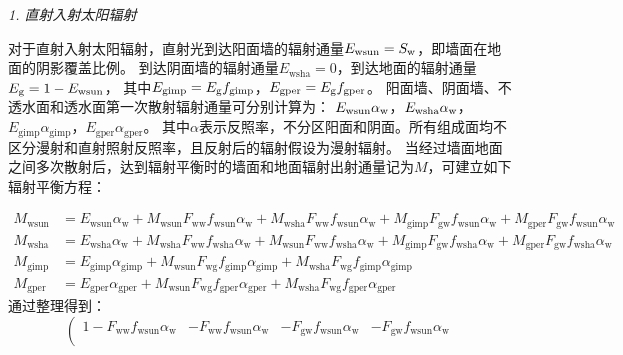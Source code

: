 \textit{1. 直射入射太阳辐射}

对于直射入射太阳辐射，直射光到达阳面墙的辐射通量$E_{\mathrm{wsun}}=S_{\rm w}$，即墙面在地面的阴影覆盖比例。
到达阴面墙的辐射通量$E_{\mathrm{wsha}}=0$，到达地面的辐射通量$E_{\rm g}=1-E_{\mathrm{wsun}}$，
其中$E_{\mathrm{gimp}}=E_{\rm g}f_{\mathrm{gimp}}$，$E_{\mathrm{gper}}=E_{\rm g}f_{\mathrm{gper}}$。
阳面墙、阴面墙、不透水面和透水面第一次散射辐射通量可分别计算为：
$E_{\mathrm{wsun}}\alpha_{\rm w}$，$E_{\mathrm{wsha}}\alpha_{\rm w}$，$E_{\mathrm{gimp}}\alpha_{\mathrm{gimp}}$，$E_{\mathrm{gper}}\alpha_{\mathrm{gper}}$。
其中$\alpha$表示反照率，不分区阳面和阴面。所有组成面均不区分漫射和直射照射反照率，且反射后的辐射假设为漫射辐射。
当经过墙面地面之间多次散射后，达到辐射平衡时的墙面和地面辐射出射通量记为$M$，可建立如下辐射平衡方程：
\begin{landscape}
  \begin{equation}
    \begin{aligned}
      M_{\mathrm{ {wsun }}} &=E_{\mathrm{wsun}} \alpha_{\mathrm{w}}+M_{\mathrm{wsun}} F_{\mathrm{ww}} f_{\mathrm{wsun}} \alpha_{\mathrm{w}}+M_{\mathrm{wsha}} F_{\mathrm{ww}} f_{\mathrm{wsun}} \alpha_{\mathrm{w}}+M_{\mathrm{gimp}} F_{\mathrm{g w}} f_{\mathrm{wsun}} \alpha_{\mathrm{w}}+M_{\mathrm{gper}} F_{\mathrm{g w}} f_{\mathrm{wsun}} \alpha_{\mathrm{w}} \\
      M_{\mathrm{wsha}} &=E_{\mathrm{wsha}} \alpha_{\mathrm{w}}+M_{\mathrm{wsha}} F_{\mathrm{ww}} f_{\mathrm{wsha}} \alpha_{\mathrm{w}}+M_{\mathrm{wsun}} F_{\mathrm{ww}} f_{\mathrm{wsha}} \alpha_{\mathrm{w}}+M_{\mathrm{gimp}} F_{\mathrm{g w}} f_{\mathrm{wsha}} \alpha_{\mathrm{w}}+M_{\mathrm{gper}} F_{\mathrm{g w}} f_{\mathrm{wsha}} \alpha_{\mathrm{w}} \\
      M_{\mathrm{gimp}} &=E_{\mathrm{gimp}} \alpha_{\mathrm{gimp}}+M_{\mathrm{wsun}} F_{\mathrm{w g}} f_{\mathrm{ gimp}} \alpha_{\mathrm{gimp}}+M_{\mathrm{wsha}} F_{\mathrm{w g}} f_{\mathrm{ gimp}} \alpha_{\mathrm{gimp}} \\
      M_{\mathrm{gper}} &=E_{\mathrm{gper}} \alpha_{\mathrm{gper}}+M_{\mathrm{wsun}} F_{\mathrm{w g}} f_{\mathrm{gper}} \alpha_{\mathrm{gper}}+M_{\mathrm{wsha}} F_{\mathrm{w g}} f_{\mathrm{gper}} \alpha_{\mathrm{gper}}
    \end{aligned}
  \end{equation}
  通过整理得到：
  \begin{equation}\label{城市无植被辐射传输方程}
    \left(\begin{array}{cccc}1-F_{\mathrm{ww}} f_{\mathrm{wsun}} \alpha_{\mathrm{w}} & -F_{\mathrm{ww}} f_{\mathrm{wsun}} \alpha_{\mathrm{w}} & -F_{\mathrm{g w}} f_{\mathrm{wsun}} \alpha_{\mathrm{w}} & -F_{\mathrm{g w}} f_{\mathrm{wsun}} \alpha_{\mathrm{w}} \\

\end{array}
\end{equation}
\end{landscape}
